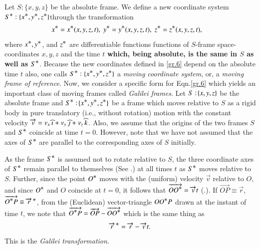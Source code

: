 Let $S:\{x,y,z\}$ be the absolute frame. We define a 
new coordinate system $S^{\textstyle \ast}:\{x^{\textstyle \ast}, y^{\textstyle \ast}, 
z^{\textstyle \ast}\}$\lbk through the transformation
\begin{align} \label{gr.6}
x^{\textstyle \ast} &= x^{\textstyle \ast} (x,y,z,t), \; y^{\textstyle \ast} = y^{\textstyle \ast}
(x,y,z,t), \; z^{\textstyle \ast} =z^{\textstyle \ast} (x,y,z,t),
\end{align}
where $x^{\textstyle \ast}, y^{\textstyle \ast}$, and $z^{\textstyle \ast}$ are differentiable 
functions functions of $S$-frame space-coordinates $x, 
y, z$ and the time $t$ \textbf{which, being absolute, 
is the same in $S$ as well as $S^{\textstyle \ast}$}. Because the 
new coordinates defined in \eqref{gr.6} depend on the 
absolute time $t$ also, one calls $S^{\textstyle \ast}:\{x^{\textstyle \ast}, 
y^{\textstyle \ast}, z^{\textstyle \ast}\}$ a \textsl{moving coordinate system}, 
 or, a \textsl{moving 
frame of reference}. 
 Now, we consider a 
specific form for Eqn.\eqref{gr.6} which yields an 
important class of moving frames called \textsl{Galilei 
frames}. Let $S : \negthinspace\{x,y,z\}$ be the absolute frame 
and $S^{\textstyle \ast}: \negthinspace \{x^{\textstyle \ast},y^{\textstyle \ast}, z^{\textstyle \ast} \}$ be a frame 
which moves relative to $S$ as a rigid body in pure 
translatory (i.e., without rotation) motion with the 
{constant velocity} $\overrightarrow{v} =v_x\,{\widehat{\imath}} +v_y\,{\widehat{\jmath}} + 
v_z\,{\widehat{k}}$. Also, we assume that  the origins of the 
two frames $S$ and $S^{\textstyle \ast}$ coincide at time $t=0$. 
However, note that we have not assumed that the axes of 
$S^{\textstyle \ast}$ are parallel to the corresponding axes of $S$ 
initially.

As  the frame $S^{\textstyle \ast}$ is assumed not to rotate 
relative to $S$, the three coordinate axes of $S^{\textstyle \ast}$ 
remain parallel to themselves (See .) at 
all times $t$ as $S^{\textstyle \ast}$ moves relative to $S$. 
Further, since the point $O^{\textstyle \ast}$ moves with the 
(uniform) velocity $\vec{v}$ relative to $O$, and since 
$O^{\textstyle \ast}$ and $O$ coincide at $t=0$, it follows that 
$\overrightarrow{OO^{\textstyle \ast}}=\overrightarrow{v}t$ (.). If 
$\vec{OP}\equiv\vec{r}$, $\overrightarrow{O^{\textstyle \ast} 
P}\equiv{\overrightarrow{r}^{\,{\ensuremath{\textstyle \ast}}}}$, from the (Euclidean) vector-triangle 
$OO^{\textstyle \ast} P$ drawn at the instant of time $t$, we note 
that $\overrightarrow{O^{\textstyle \ast} P} = \overrightarrow{OP}-\overrightarrow{OO^{\textstyle \ast}}$ which is 
the same thing as
\begin{align}\label{gr.7}
{\overrightarrow{r}^{\,{\ensuremath{\textstyle \ast}}}}=\overrightarrow{r} - \overrightarrow{v}t.
\end{align}
This is the \textsl{Galilei transformation}.

